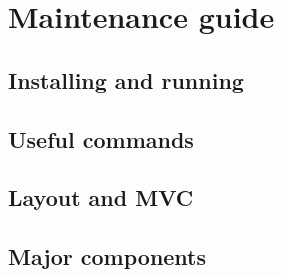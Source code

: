 \chapter{Maintenance guide}
\section{Installing and running}
\section{Useful commands}
\section{Layout and MVC}
\section{Major components}